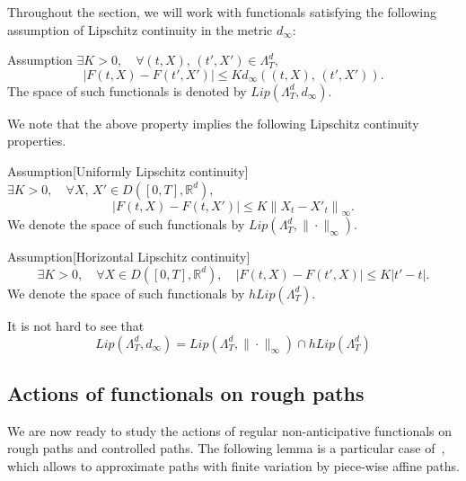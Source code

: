 \documentclass[10pt]{amsart}
\theoremstyle{definition}\newtheorem{defi}[theo]{Definition}\newtheorem{rema}[theo]{Remark}\newtheorem{exam}[theo]{Example}\newtheorem{exem}[theo]{Example}\newtheorem{nota}[theo]{Notation}
\newcommand{\Rr}{{\mathbb{R}}}
\let\oldexists\exists
\renewcommand*{\exists}{\mathrel{\oldexists}}
\let\oldforall\forall
\renewcommand*{\forall}{\mathrel{\oldforall}}
\begin{document}
Throughout the section, we will work with functionals satisfying the following assumption of Lipschitz continuity in the metric $d_{\infty}:$

\begin{enonce}{Assumption}\label{chp3ass.lipd}
$\exists K>0, \quad \forall (t, X),\, (t', X')\in \Lambda^d_T,$
\[
\left|F(t,X)-F\left(t',X'\right)\right|\leq K d_{\infty}\left((t, X),\, \left(t', X'\right)\right).
\]
The space of such functionals is denoted by $Lip(\Lambda_T^d, d_{\infty}).$
\end{enonce}

We note that the above property implies the following Lipschitz continuity properties.

\begin{enonce}{Assumption}[Uniformly Lipschitz continuity]\label{chp3ass.Fholder}
$\exists K>0, \quad \forall X,\, X'\in D([0,T], \Rr^d),$
\[
\left|F(t,X)-F\left(t,X'\right)\right|\leq K \left\|X_t-X'_t\right\|_{\infty}.
\]
We denote the space of such functionals by $Lip(\Lambda_T^d, \|\cdot\|_{\infty}).$
\end{enonce}

\begin{enonce}
{Assumption}[Horizontal Lipschitz continuity]\label{chp3ass.horizlip}
\[
\exists K>0, \quad \forall X\in D\left([0,T], \Rr^d\right),\quad \left|F(t,X)-F\left(t',X\right)\right|\leq K \left|t'-t\right|.
\]
We denote the space of such functionals by $hLip(\Lambda_T^d).$
\end{enonce}

It is not hard to see that
\[
Lip\left(\Lambda_T^d, d_{\infty}\right)=Lip\left(\Lambda_T^d, \|\cdot\|_{\infty}\right) \cap hLip\left(\Lambda_T^d\right)
\]

\subsection{Actions of functionals on rough paths}
We are now ready to study the actions of regular non-anticipative functionals on rough paths and controlled paths. The following lemma is a particular case of~\cite[Lemma~5.11]{Anna}, which allows to approximate paths with finite variation by piece-wise affine paths.
\end{document}

